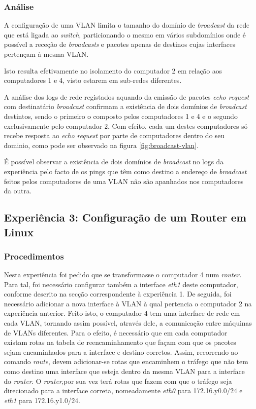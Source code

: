 \documentclass{article}
\begin{document}
\subsubsection{Análise}
A configuração de uma VLAN limita o tamanho do domínio de \textit{broadcast} da rede que está ligada ao \textit{switch}, particionando o mesmo em vários subdomínios onde é possível a receção de \textit{broadcasts} e pacotes apenas de destinos cujas interfaces pertençam à mesma VLAN.

Isto resulta efetivamente no isolamento do computador 2 em relação aos computadores 1 e 4, visto estarem em sub-redes diferentes.

A análise dos logs de rede registados aquando da emissão de pacotes \textit{echo request} com destinatário \textit{broadcast} confirmam a existência de dois domínios de \textit{broadcast} destintos, sendo o primeiro o composto pelos computadores 1 e 4 e o segundo exclusivamente pelo computador 2. Com efeito, cada um destes computadores só recebe resposta ao \textit{echo request} por parte de computadores dentro do seu dominio, como pode ser observado na figura \ref{fig:broadcast-vlan}.




É possível observar a existência de dois domínios de \textit{broadcast} no logs da experiência pelo facto de os pings que têm como destino a endereço de \textit{broadcast} feitos pelos computadores de uma VLAN não são apanhados nos computadores da outra.

\subsection{Experiência 3: Configuração de um Router em Linux}

\subsubsection{Procedimentos}
Nesta experiência foi pedido que se transformasse o computador 4  num \textit{router}. Para tal, foi necessário configurar também a interface \textit{eth1} deste computador, conforme descrito na secção correspondente à experiência 1. De seguida, foi necessário adicionar a nova interface à VLAN à qual pertencia o computador 2 na experiência anterior. Feito isto, o computador 4 tem uma interface de rede em cada VLAN, tornando assim possível, através dele, a comunicação entre máquinas de VLANs diferentes. Para o efeito, é necessário que em cada computador existam rotas na tabela de reencaminhamento que façam com que os pacotes sejam encaminhados para a interface e destino corretos. Assim, recorrendo ao comando \textit{route}, devem adicionar-se rotas que encaminhem o tráfego que não tem como destino uma interface que esteja dentro da mesma VLAN para a interface do \textit{router}. O \textit{router},por sua vez terá rotas que fazem com que o tráfego seja direcionado para a interface correta, nomeadamente \textit{eth0} para 172.16.y0.0/24 e \textit{eth1} para 172.16.y1.0/24.
\end{document}
